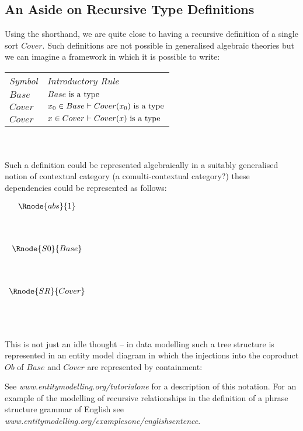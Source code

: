\subsection {An Aside on Recursive Type Definitions}

Using the shorthand, we are quite close to having a recursive definition of a single sort $Cover$.
Such definitions are not possible in generalised algebraic theories but we can imagine a framework in which it is possible to write: \\
\vspace{0.03cm} 
\begin{tabular}{>{\itshape}l l}
Symbol & \itshape{Introductory Rule} \\
$Base $     & $Base\mbox{ is a type}$\\
$Cover  $     & $x_0 \in Base    \vdash Cover(x_0)\mbox{ is a type} $\\
$Cover $      & $x \in Cover    \vdash Cover(x)\mbox{ is a type} $\\
\end{tabular} \\
\vspace{.1cm}  \\

Such a definition could be represented algebraically in a suitably generalised notion of contextual category (a comulti-contextual category?) these dependencies could be represented
as follows:  

\begin{center}
$
\begin{array}{c c}
\Rnode{abs}{1}  \\ [1.4cm]
\Rnode{S0}{Base} \\ [1.4cm]
\Rnode{SR}{Cover} \\ [1.4cm]
\end{array}
$
\end{center}

\noindent This is not just an idle thought -- in  data modelling such a tree 
structure is represented in an entity model diagram in which the injections into the coproduct $Ob$ of $Base$ and $Cover$ are represented by containment: \\

\begin{center}

\end {center}
See \textit{www.entitymodelling.org/tutorialone} for a description of this notation.
For an example of the modelling of recursive relationships in the definition of a phrase structure grammar of English see 
\textit{www.entitymodelling.org/examplesone/englishsentence}.